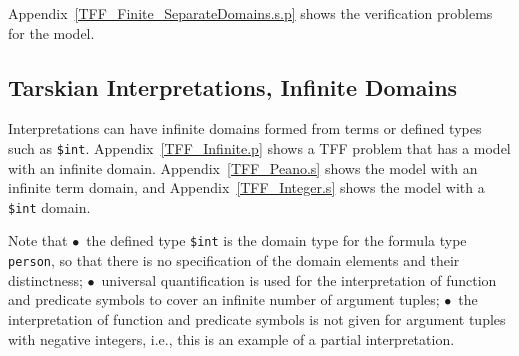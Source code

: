\documentclass{easychair}
\newcommand{\smalltt}[1]{\small \texttt{#1}}
\begin{document}
Appendix~\ref{TFF_Finite_SeparateDomains.s.p} shows the verification problems for the model.

\subsection{Tarskian Interpretations, Infinite Domains}
\label{TarskianInfinite}

Interpretations can have infinite domains formed from terms or defined types such as {\tt \$int}.
Appendix~\ref{TFF_Infinite.p} shows a TFF problem that has a model with an infinite domain.
Appendix~\ref{TFF_Peano.s} shows the model with an infinite term domain, and
Appendix~\ref{TFF_Integer.s} shows the model with a {\tt \$int} domain.

      Note that $\bullet$~the defined type {\smalltt{\$int}} is the domain type for the formula 
      type {\smalltt{person}}, so that there is no specification of the domain elements and their 
      distinctness; $\bullet$~universal quantification is used for the interpretation of function 
      and predicate symbols to cover an infinite number of argument tuples; $\bullet$~the 
      interpretation of function and predicate symbols is not given for argument tuples with 
      negative integers, i.e., this is an example of a partial interpretation.
\end{document}
